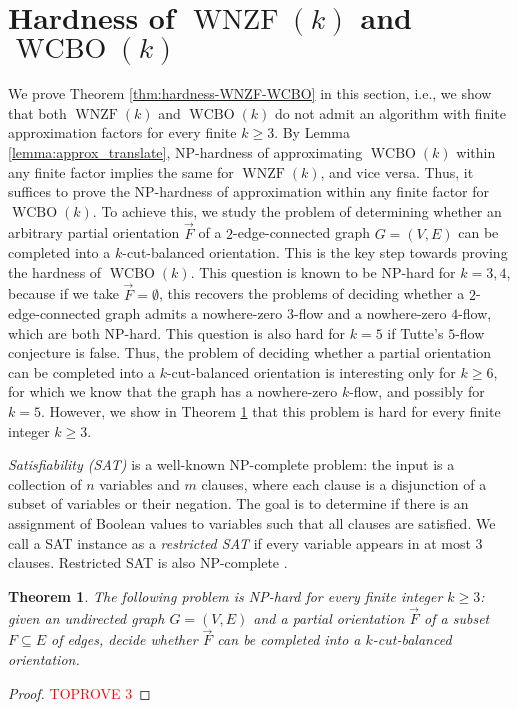 \documentclass[11pt]{article}
\newtheorem{theorem}{Theorem}
\begin{document}
\section{Hardness of $\operatorname{WNZF}(k)$ and $\operatorname{WCBO}(k)$}\label{sec:complexity-WNZF+WCBO}
We prove Theorem \ref{thm:hardness-WNZF-WCBO} in this section, i.e., we show that both $\operatorname{WNZF}(k)$ and $\operatorname{WCBO}(k)$ do not admit an algorithm with finite approximation factors for every finite $k\geq 3$.
By Lemma \ref{lemma:approx_translate}, NP-hardness of approximating $\operatorname{WCBO}(k)$ within any finite factor implies the same for $\operatorname{WNZF}(k)$, and vice versa.
Thus, it suffices to prove the NP-hardness of approximation within any finite factor for $\operatorname{WCBO}(k)$.
To achieve this, we study the problem of determining whether an arbitrary partial orientation $\vec{F}$ of a $2$-edge-connected graph $G=(V,E)$ can be completed into a $k$-cut-balanced orientation. This is the key step towards proving the hardness of $\operatorname{WCBO}(k)$. This question is known to be NP-hard for $k=3,4$, because if we take $\vec{F}=\emptyset$, this recovers the problems of deciding whether a $2$-edge-connected graph admits a nowhere-zero $3$-flow and a nowhere-zero $4$-flow, which are both NP-hard. This question is also hard for $k=5$ if Tutte's $5$-flow conjecture is false. Thus, the problem of deciding whether a partial orientation can be completed into a $k$-cut-balanced orientation is interesting only for $k\geq 6$, for which we know that the graph has a nowhere-zero $k$-flow, and possibly for $k=5$. However, we show in Theorem \ref{thm:complete-CBO-hard} that this problem is hard for every finite integer $k\geq 3$.

\emph{Satisfiability (SAT)} is a well-known NP-complete problem: the input is a collection of $n$ variables and $m$ clauses, where each clause is a disjunction of a subset of variables or their negation. The goal is to determine if there is an assignment of Boolean values to variables such that all clauses are satisfied. We call a SAT instance as a \emph{restricted SAT} if every variable appears in at most $3$ clauses. Restricted SAT is also NP-complete \cite{tovey1984simplified}.

\begin{theorem}\label{thm:complete-CBO-hard}
The following problem is NP-hard for every finite integer $k\ge 3$: given an undirected graph $G=(V, E)$ and a partial orientation $\vec{F}$ of a subset $F\subseteq E$ of edges, decide whether $\vec{F}$ can be completed into a $k$-cut-balanced orientation.
\end{theorem}
\begin{proof}\textcolor{red}{TOPROVE 3}\end{proof}
\end{document}
